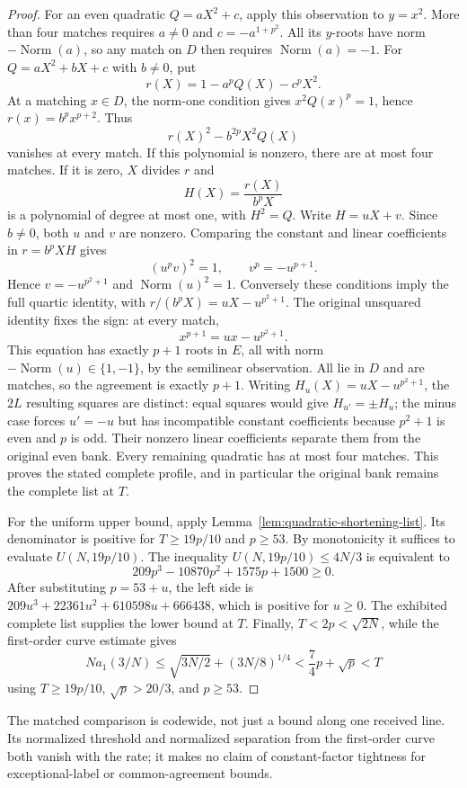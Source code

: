 \begin{proof}
For an even quadratic $Q=aX^2+c$, apply this observation to
$y=x^2$. More than four matches requires
$a\ne0$ and $c=-a^{1+p^2}$. All its $y$-roots have norm
$-\operatorname{Norm}(a)$, so any match on $D$ then requires
$\operatorname{Norm}(a)=-1$.
For $Q=aX^2+bX+c$ with $b\ne0$, put
\[
 r(X)=1-a^pQ(X)-c^pX^2.
\]
At a matching $x\in D$, the norm-one condition gives
$x^2Q(x)^p=1$, hence $r(x)=b^px^{p+2}$. Thus
\[
 r(X)^2-b^{2p}X^2Q(X)
\]
vanishes at every match. If this polynomial is nonzero, there are at
most four matches. If it is zero, $X$ divides $r$ and
\[
 H(X)=\frac{r(X)}{b^pX}
\]
is a polynomial of degree at most one, with $H^2=Q$.
Write $H=uX+v$. Since $b\ne0$, both $u$ and $v$ are nonzero.
Comparing the constant and linear coefficients in $r=b^pXH$ gives
\[
 (u^pv)^2=1,\qquad v^p=-u^{p+1}.
\]
Hence $v=-u^{p^2+1}$ and $\operatorname{Norm}(u)^2=1$.
Conversely these conditions imply the full quartic identity, with
$r/(b^pX)=uX-u^{p^2+1}$.
The original unsquared identity fixes the sign: at every match,
\[
 x^{p+1}=u x-u^{p^2+1}.
\]
This equation has exactly $p+1$ roots in $E$, all with norm
$-\operatorname{Norm}(u)\in\{1,-1\}$, by the semilinear observation.
All lie in $D$ and are matches, so the agreement is exactly $p+1$.
Writing $H_u(X)=uX-u^{p^2+1}$, the $2L$ resulting squares are distinct:
equal squares would give $H_{u'}=\pm H_u$; the minus case forces
$u'=-u$ but has incompatible constant coefficients because $p^2+1$
is even and $p$ is odd.
Their nonzero linear coefficients separate them from the original
even bank. Every remaining quadratic has at most four matches.
This proves the stated complete profile, and in particular the
original bank remains the complete list at $T$.

For the uniform upper bound, apply Lemma~\ref{lem:quadratic-shortening-list}.
Its denominator is positive for $T\ge19p/10$ and $p\ge53$.
By monotonicity it suffices to evaluate $U(N,19p/10)$.
The inequality $U(N,19p/10)\le4N/3$ is equivalent to
\[
 209p^3-10870p^2+1575p+1500\ge0.
\]
After substituting $p=53+u$, the left side is
$209u^3+22361u^2+610598u+666438$, which is positive for $u\ge0$.
The exhibited complete list supplies the lower bound at $T$.
Finally, $T<2p<\sqrt{2N}$, while the first-order curve estimate gives
\[
 N a_1(3/N)\le\sqrt{3N/2}+(3N/8)^{1/4}
 <\frac74p+\sqrt p<T
\]
using $T\ge19p/10$, $\sqrt p>20/3$, and $p\ge53$.
\end{proof}

The matched comparison is codewide, not just a bound along one received
line. Its normalized threshold and normalized separation from the
first-order curve both vanish with the rate; it makes no claim of
constant-factor tightness for exceptional-label or common-agreement
bounds.


